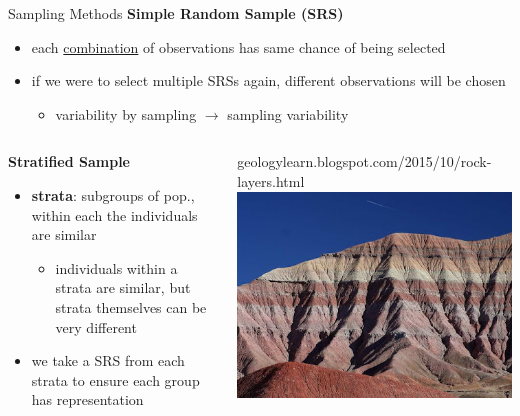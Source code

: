 \documentclass{beamer}
\begin{document}
\begin{frame}{Sampling Methods}
\textbf{Simple Random Sample (SRS)}
\begin{itemize}
    \item each \underline{combination} of observations has same chance of being selected
    \item if we were to select multiple SRSs again, different observations will be chosen
        \begin{itemize}
            \item variability by sampling $\rightarrow$ sampling variability
        \end{itemize}
\end{itemize} \vspace{6mm}

\begin{columns}

\begin{column}{0.55\textwidth}
\textbf{Stratified Sample}
\begin{itemize}
    \item \textbf{strata}: subgroups of pop., within each the individuals are similar
        \begin{itemize}
            \item individuals within a strata are similar, but strata themselves can be very different
        \end{itemize}
    \item we take a SRS from each strata to ensure each group has representation
\end{itemize}
\centering
\end{column}

  \begin{column}{0.45\textwidth}
\begin{center}
{\tiny geologylearn.blogspot.com/2015/10/rock-layers.html}
\includegraphics[scale=0.35]{img/strata_rock_layers.jpg}
\end{center}
  \end{column}
\end{columns}
\end{frame}
\end{document}
